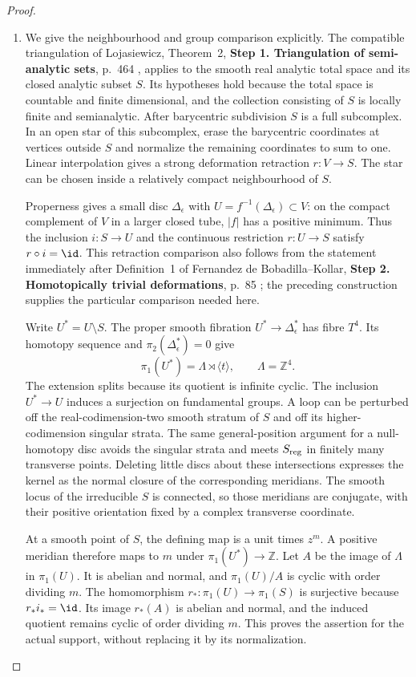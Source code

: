 \begin{proof}
\begin{enumerate}[label={$\langle1\rangle$\arabic*.},leftmargin=*]
\item 
We give the neighbourhood and group comparison explicitly.
The compatible triangulation of Lojasiewicz, Theorem~2,
\noindent\textbf{Step 1. Triangulation of semi-analytic sets}, p.~464 \cite{Lojasiewicz1964}, applies to
the smooth real analytic total space and its closed analytic
subset $S$. Its hypotheses hold because the total space is
countable and finite dimensional, and the collection consisting
of $S$ is locally finite and semianalytic. After barycentric
subdivision $S$ is a full subcomplex. In an open star of this
subcomplex, erase the barycentric coordinates at vertices
outside $S$ and normalize the remaining coordinates to sum
to one. Linear interpolation gives a strong deformation
retraction $r:V\to S$. The star can be chosen inside a
relatively compact neighbourhood of $S$.

Properness gives a small disc $\Delta_\epsilon$ with
$U=f^{-1}(\Delta_\epsilon)\subset V$: on the compact
complement of $V$ in a larger closed tube, $|f|$ has a
positive minimum. Thus the inclusion $i:S\to U$ and the
continuous restriction $r:U\to S$ satisfy $r\circ i=\id$.
This retraction comparison also follows from the statement
immediately after Definition~1 of Fernandez de Bobadilla--Kollar,
\noindent\textbf{Step 2. Homotopically trivial deformations}, p.~85 \cite{BobadillaKollar2012}; the preceding
construction supplies the particular comparison needed here.

Write $U^*=U\setminus S$. The proper smooth fibration
$U^*\to\Delta_\epsilon^*$ has fibre $T^4$. Its homotopy
sequence and $\pi_2(\Delta_\epsilon^*)=0$ give
\[
 \pi_1(U^*)=\Lambda\rtimes\langle t\rangle,
 \qquad \Lambda=\mathbb Z^4.
\]
The extension splits because its quotient is infinite cyclic.
The inclusion $U^*\to U$ induces a surjection on fundamental
groups. A loop can be perturbed off the real-codimension-two
smooth stratum of $S$ and off its higher-codimension singular
strata. The same general-position argument for a null-homotopy
disc avoids the singular strata and meets $S_{\rm reg}$ in
finitely many transverse points. Deleting little discs about
these intersections expresses the kernel as the normal closure
of the corresponding meridians. The smooth locus of the
irreducible $S$ is connected, so those meridians are conjugate,
with their positive orientation fixed by a complex transverse
coordinate.

At a smooth point of $S$, the defining map is a unit times
$z^m$. A positive meridian therefore maps to $m$ under
$\pi_1(U^*)\to\mathbb Z$. Let $A$ be the image of $\Lambda$
in $\pi_1(U)$. It is abelian and normal, and
$\pi_1(U)/A$ is cyclic with order dividing $m$.
The homomorphism $r_*:\pi_1(U)\to\pi_1(S)$ is surjective
because $r_*i_*=\id$. Its image $r_*(A)$ is abelian and
normal, and the induced quotient remains cyclic of order
dividing $m$. This proves the assertion for the actual support,
without replacing it by its normalization.

\end{enumerate}
\end{proof}

